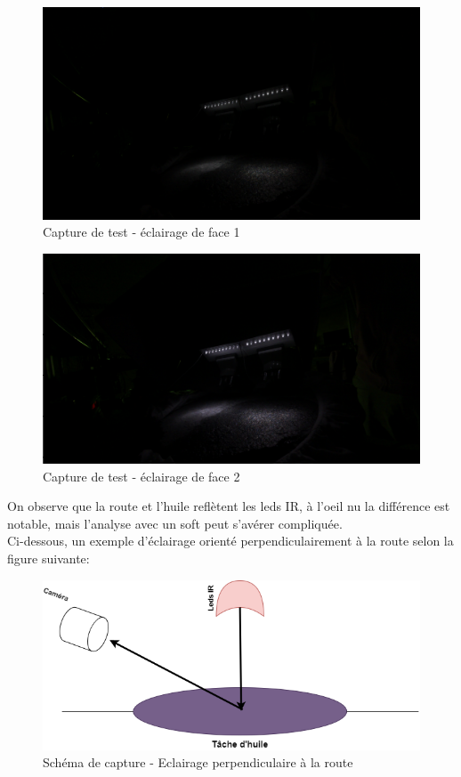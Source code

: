 \begin{figure}[H]
    \centering
    \includegraphics[width=13cm]{assets/figures/eclairage_face1.png}
    \caption{Capture de test - éclairage de face 1}
\end{figure}
\begin{figure}[H]
    \centering
    \includegraphics[width=13cm]{assets/figures/eclairage_face2.png}
    \caption{Capture de test - éclairage de face 2}
\end{figure}

On observe que la route et l'huile reflètent les leds IR, à l'oeil nu la différence est notable, mais l'analyse avec un soft peut s'avérer compliquée.\\
Ci-dessous, un exemple d'éclairage orienté perpendiculairement à la route selon la figure suivante:
\begin{figure}[H]
    \centering
    \includegraphics[width=13cm]{assets/figures/eclairage_perpendiculaire.png}
    \caption{Schéma de capture - Eclairage perpendiculaire à la route}
\end{figure}

